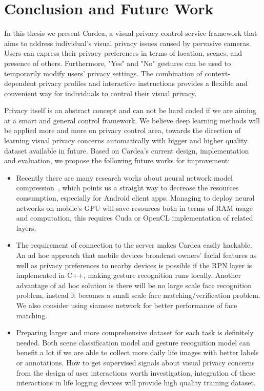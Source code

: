 \chapter{Conclusion and Future Work}\label{sec-conclusion}

In this thesis we present Cardea, a visual privacy control service framework that aims to address individual's visual privacy issues caused by pervasive cameras. Users can express their privacy preferences in terms of location, scenes, and presence of others. Furthermore, "Yes" and "No" gestures can be used to temporarily modify users' privacy settings. The combination of context-dependent privacy profiles and interactive instructions provides a flexible and convenient way for individuals to control their visual privacy.



Privacy itself is an abstract concept and can not be hard coded if we are aiming at a smart and general control framework. We believe deep learning methods will be applied more and more on privacy control area, towards the direction of learning visual privacy concerns automatically with bigger and higher quality dataset available in future. Based on Cardea's current design, implementation and evaluation, we propose the following future works for improvement:

\begin{itemize}

\item Recently there are many research works about neural network model compression~\cite{han2015deep}, which points us a straight way to decrease the resources consumption, especially for Android client apps. Managing to deploy neural networks on mobile's GPU will save resources both in terms of RAM usage and computation, this requires Cuda or OpenCL implementation of related layers.
\item The requirement of connection to the server makes Cardea easily hackable. An ad hoc approach that mobile devices broadcast owners' facial features as well as privacy preferences to nearby devices is possible if the RPN layer is implemented in C++, making gesture recognition runs locally. Another advantage of ad hoc solution is there will be no large scale face recognition problem, instead it becomes a small scale face matching/verification problem. We also consider using siamese network for better performance of face matching.
\item Preparing larger and more comprehensive dataset for each task is definitely needed. Both scene classification model and gesture recognition model can benefit a lot if we are able to collect more daily life images with better labels or annotations. How to get supervised signals about visual privacy concerns from the design of user interactions worth investigation, integration of these interactions in life logging devices will provide high quality training dataset.

\end{itemize}



\newpage
